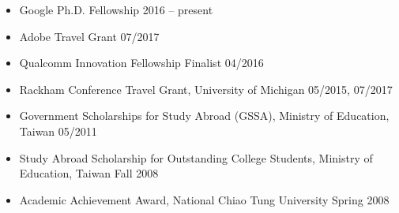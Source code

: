 \documentclass[10pt]{article}
\newenvironment{innerlist}[1][\enskip\textbullet]%
        {\begin{itemize}[#1,leftmargin=*,parsep=0pt,itemsep=0pt,topsep=0pt,partopsep=0pt]}
        {\end{itemize}}
\newcommand{\halfblankline}{\quad\vspace{-0.5\baselineskip}\pagebreak[3]}
\begin{document}
\begin{itemize}[leftmargin=0pt,parsep=3pt,itemsep=0pt,topsep=0pt,partopsep=0pt]
\item[] Google Ph.D. Fellowship \hfill 2016 -- present
\item[] Adobe Travel Grant \hfill 07/2017
\item[] Qualcomm Innovation Fellowship Finalist \hfill 04/2016
\item[] Rackham Conference Travel Grant, University of Michigan \hfill 05/2015, 07/2017
\item[] Government Scholarships for Study Abroad (GSSA), Ministry of Education, Taiwan \hfill 05/2011
\item[] Study Abroad Scholarship for Outstanding College Students, Ministry of Education, Taiwan \hfill Fall 2008
\item[] Academic Achievement Award, National Chiao Tung University \hfill Spring 2008
\end{itemize}
%
%
%
%
\end{document}
